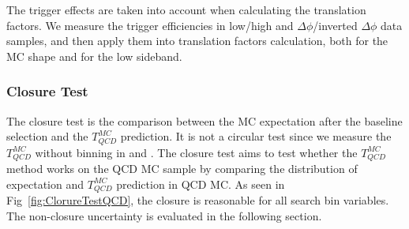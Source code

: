 The trigger effects are taken into account when calculating the translation factors. We measure the trigger efficiencies in low/high \HT and $\Delta\phi$/inverted $\Delta\phi$ data samples, and then apply them into translation factors calculation, both for the MC shape and for the low \MET sideband.

\subsubsection{Closure Test}
The closure test is the comparison between the MC expectation after the baseline selection and the $T_{QCD}^{MC}$ prediction. It is not a circular test since we measure the $T_{QCD}^{MC}$ without binning in \ntops and \nbjets. 
The closure test aims to test whether the $T_{QCD}^{MC}$ method works on the QCD MC sample by comparing the distribution of expectation and $T_{QCD}^{MC}$ prediction in QCD MC.
As seen in Fig~\ref{fig:ClorureTestQCD}, the closure is reasonable for all search bin variables. The non-closure uncertainty is evaluated in the following section.
